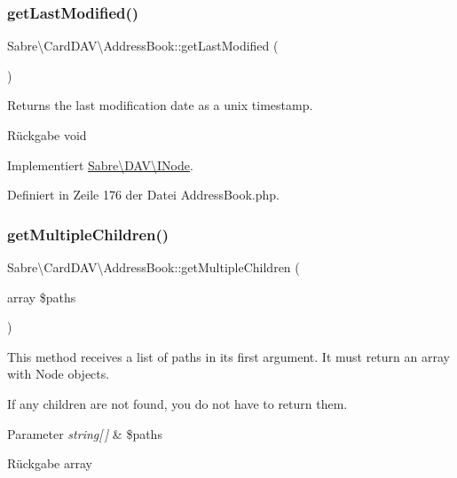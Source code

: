 \subsubsection{\texorpdfstring{get\+Last\+Modified()}{getLastModified()}}
{\footnotesize\ttfamily Sabre\textbackslash{}\+Card\+D\+A\+V\textbackslash{}\+Address\+Book\+::get\+Last\+Modified (\begin{DoxyParamCaption}{ }\end{DoxyParamCaption})}

Returns the last modification date as a unix timestamp.

\begin{DoxyReturn}{Rückgabe}
void 
\end{DoxyReturn}


Implementiert \mbox{\hyperlink{interface_sabre_1_1_d_a_v_1_1_i_node_a06335f81c7d4ec2c6d9e327c8ce61014}{Sabre\textbackslash{}\+D\+A\+V\textbackslash{}\+I\+Node}}.



Definiert in Zeile 176 der Datei Address\+Book.\+php.

\mbox{\label{class_sabre_1_1_card_d_a_v_1_1_address_book_a2075137110f456a965e38fdb3b254bb6}} 
\subsubsection{\texorpdfstring{get\+Multiple\+Children()}{getMultipleChildren()}}
{\footnotesize\ttfamily Sabre\textbackslash{}\+Card\+D\+A\+V\textbackslash{}\+Address\+Book\+::get\+Multiple\+Children (\begin{DoxyParamCaption}\item[{array}]{\$paths }\end{DoxyParamCaption})}

This method receives a list of paths in it\textquotesingle{}s first argument. It must return an array with Node objects.

If any children are not found, you do not have to return them.


\begin{DoxyParams}{Parameter}
{\em string\mbox{[}$\,$\mbox{]}} & \$paths \\
\hline
\end{DoxyParams}
\begin{DoxyReturn}{Rückgabe}
array 
\end{DoxyReturn}


